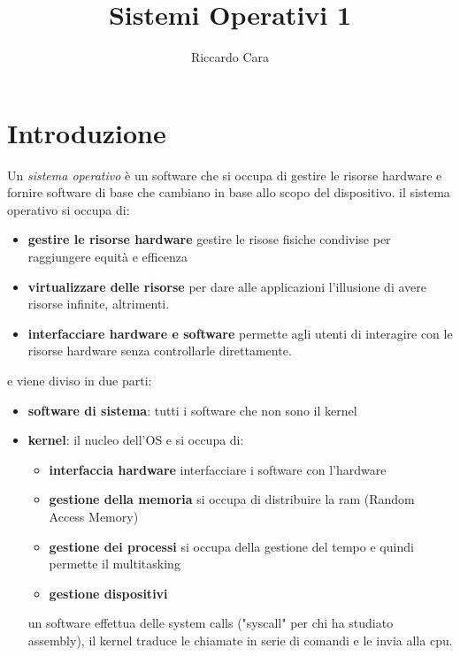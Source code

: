 \documentclass{article}
\title{Sistemi Operativi 1}
\author{Riccardo Cara}
\begin{document}
\maketitle
\tableofcontents
\newpage

\section{Introduzione}

    Un \textit{sistema operativo} è un software che si occupa di gestire le risorse hardware e fornire software di base che cambiano in base allo scopo del dispositivo.
    il sistema operativo si occupa di:

    \begin{itemize}
        \item \textbf{gestire le risorse hardware} gestire le risose fisiche condivise per raggiungere equità e efficenza
        \item \textbf{virtualizzare delle risorse} per dare alle applicazioni l'illusione di avere risorse infinite, altrimenti.
        \item \textbf{interfacciare hardware e software} permette agli utenti di interagire con le risorse hardware senza controllarle direttamente.
    \end{itemize}
    e viene diviso in due parti:

    \begin{itemize}
        \item \textbf{software di sistema}:
        tutti i software che non sono il kernel

        \item \textbf{kernel}:
        il nucleo dell'OS e si occupa di:
        
            \begin{itemize}
                \item \textbf{interfaccia hardware}
                interfacciare  i software con l'hardware

                \item \textbf{gestione della memoria}
                si occupa di distribuire la ram (Random Access Memory)
                
                \item \textbf{gestione dei processi}
                si occupa della gestione del tempo e quindi permette il multitasking
                
                \item \textbf{gestione dispositivi}
            \end{itemize}
            un software effettua delle system calls ("syscall" per chi ha studiato assembly), il kernel traduce le chiamate in serie di comandi e le invia alla cpu.
        
        
    \end{itemize}
\end{document}
